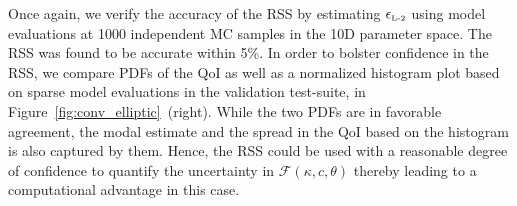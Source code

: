 Once again, we verify the accuracy of the RSS by estimating $\epsilon_{\mbox{\tiny{L-2}}}$
using model evaluations at 1000 independent MC samples in the 10D parameter
space. The RSS was found to be accurate
within 5$\%$. In order to bolster confidence in the RSS, we compare PDFs of the QoI
as well as a normalized histogram plot based on sparse model evaluations in the  
validation test-suite, in 
Figure~\ref{fig:conv_elliptic}~(right). While the two PDFs are in favorable agreement,
the modal estimate and the spread in the QoI based on the histogram is also captured
by them. Hence, the RSS could be used with a reasonable degree of confidence to
quantify the uncertainty in $\mathcal{F}(\kappa, c, \theta)$ thereby leading to
a computational advantage in this case.































